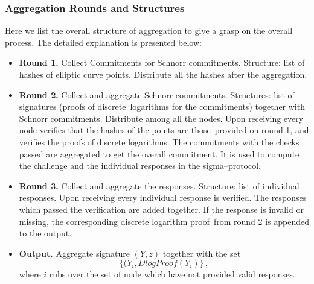 \subsubsection{Aggregation Rounds and Structures}
Here we list the overall structure of aggregation to give a grasp on the overall process.
The detailed explanation is presented below:
\begin{itemize}
    \item [] \textbf{Round 1.} Collect Commitments for Schnorr commitments.
    Structure: list of hashes of elliptic curve points.
    Distribute all the hashes after the aggregation.
    \item [] \textbf{Round 2.} Collect and aggregate Schnorr commitments.
    Structures: list of signatures (proofs of discrete\
    logarithms for the commitments) together with Schnorr commitments.
    Distribute among all the nodes.
    Upon receiving every node verifies that the hashes of the points are those\
    provided on round 1, and verifies the proofs of discrete logarithms.
    The commitments with the checks passed are aggregated to get the overall commitment.
    It is used to compute the challenge and the individual responses in
    the sigma--protocol.
    \item [] \textbf{Round 3.} Collect and aggregate the responses.
    Structure: list of individual responses.
    Upon receiving every individual response is verified.
    The responses which passed the verification are added together.
    If the response is invalid or missing, the corresponding discrete logarithm proof\
    from round 2 is appended to the output.

    \item [] \textbf{Output.} Aggregate signature $(Y,z)$ together with the set\
    \[
        \{(Y_i, DlogProof(Y_i)\}\,,
    \]
    where $i$ rubs over the set of node which have not provided valid responses.
\end{itemize}

